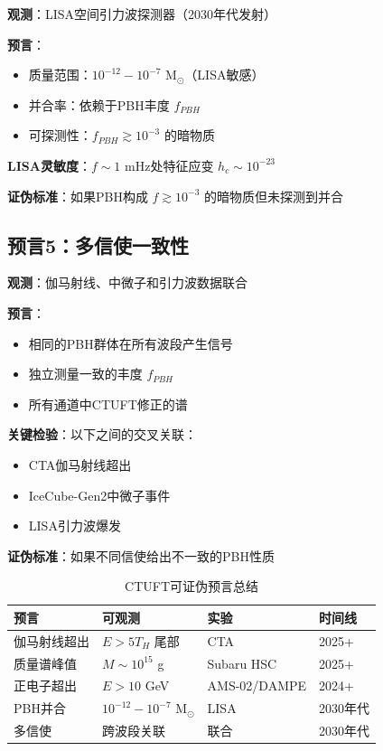 \textbf{观测}：LISA空间引力波探测器（2030年代发射）

\textbf{预言}：
\begin{itemize}
    \item 质量范围：$10^{-12} - 10^{-7}$ M$_\odot$（LISA敏感）
    \item 并合率：依赖于PBH丰度 $f_{PBH}$
    \item 可探测性：$f_{PBH} \gtrsim 10^{-3}$ 的暗物质
\end{itemize}

\textbf{LISA灵敏度}：$f \sim 1$ mHz处特征应变 $h_c \sim 10^{-23}$

\textbf{证伪标准}：如果PBH构成 $f \gtrsim 10^{-3}$ 的暗物质但未探测到并合

\subsection{预言5：多信使一致性}
\label{subsec:prediction-multi}

\textbf{观测}：伽马射线、中微子和引力波数据联合

\textbf{预言}： 
\begin{itemize}
    \item 相同的PBH群体在所有波段产生信号
    \item 独立测量一致的丰度 $f_{PBH}$
    \item 所有通道中CTUFT修正的谱
\end{itemize}

\textbf{关键检验}：以下之间的交叉关联：
\begin{itemize}
    \item CTA伽马射线超出
    \item IceCube-Gen2中微子事件
    \item LISA引力波爆发
\end{itemize}

\textbf{证伪标准}：如果不同信使给出不一致的PBH性质

\begin{table}[htbp]
\centering
\caption{CTUFT可证伪预言总结}
\label{tab:predictions}
\begin{tabular}{@{}llll@{}}
\toprule
\textbf{预言} & \textbf{可观测} & \textbf{实验} & \textbf{时间线} \\
\midrule
伽马射线超出 & $E > 5T_H$ 尾部 & CTA & 2025+ \\
质量谱峰值 & $M \sim 10^{15}$ g & Subaru HSC & 2025+ \\
正电子超出 & $E > 10$ GeV & AMS-02/DAMPE & 2024+ \\
PBH并合 & $10^{-12}-10^{-7}$ M$_\odot$ & LISA & 2030年代 \\
多信使 & 跨波段关联 & 联合 & 2030年代 \\
\bottomrule
\end{tabular}
\end{table}

